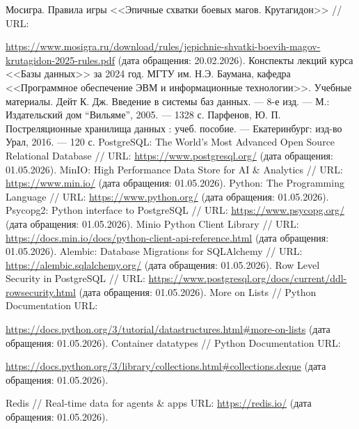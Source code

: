 \begin{thebibliography}{}
	 Мосигра. Правила игры <<Эпичные схватки боевых магов.
	Крутагидон>> // URL:

	\url{https://www.mosigra.ru/download/rules/jepichnie-shvatki-boevih-magov-krutagidon-2025-rules.pdf}
	(дата обращения: 20.02.2026).
	 Конспекты лекций курса <<Базы данных>> за 2024 год.
	МГТУ им. Н.Э. Баумана, кафедра <<Программное обеспечение ЭВМ и
	информационные
	технологии>>. Учебные материалы.
	 Дейт К. Дж. Введение в системы баз данных. --- 8-е изд.
	--- М.: Издательский дом ``Вильяме'', 2005. --- 1328 с.
	 Парфенов, Ю. П. Постреляционные хранилища данных :
	учеб. пособие. --- Екатеринбург: изд-во Урал, 2016. --- 120 с.
	 PostgreSQL: The World's Most Advanced Open Source
	Relational Database // URL: \url{https://www.postgresql.org/} (дата
	обращения:
	01.05.2026).
	 MinIO: High Performance Data Store for AI \& Analytics
	// URL: \url{https://www.min.io/} (дата обращения: 01.05.2026).
	 Python: The Programming Language // URL:
	\url{https://www.python.org/} (дата обращения: 01.05.2026).
	 Psycopg2: Python interface to PostgreSQL // URL:
	\url{https://www.psycopg.org/} (дата обращения: 01.05.2026).
	 Minio Python Client Library // URL:
	\url{https://docs.min.io/docs/python-client-api-reference.html} (дата
	обращения: 01.05.2026).
	 Alembic: Database Migrations for SQLAlchemy // URL:
	\url{https://alembic.sqlalchemy.org/} (дата обращения: 01.05.2026).
	 Row Level Security in PostgreSQL // URL:
	\url{https://www.postgresql.org/docs/current/ddl-rowsecurity.html}
	(дата
	обращения: 01.05.2026).
	 More on Lists // Python Documentation URL:

	\url{https://docs.python.org/3/tutorial/datastructures.html#more-on-lists}
	(дата обращения: 01.05.2026).
	 Container datatypes // Python Documentation URL:

	\url{https://docs.python.org/3/library/collections.html#collections.deque}
	(дата обращения: 01.05.2026).

	 Redis // Real-time data for agents \& apps URL:
	\url{https://redis.io/} (дата обращения: 01.05.2026).
\end{thebibliography}